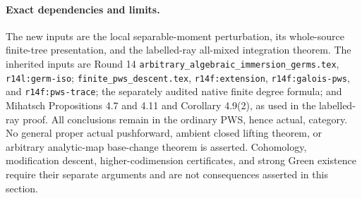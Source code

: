\paragraph{Exact dependencies and limits.}
The new inputs are the local separable-moment perturbation,
its whole-source finite-tree presentation, and the labelled-ray
all-mixed integration theorem.  The inherited inputs are Round 14
\texttt{arbitrary\_algebraic\_immersion\_germs.tex},
\texttt{r14l:germ-iso};
\texttt{finite\_pws\_descent.tex},
\texttt{r14f:extension}, \texttt{r14f:galois-pws}, and
\texttt{r14f:pws-trace}; the separately audited native finite
degree formula; and Mihatsch Propositions 4.7 and 4.11 and
Corollary 4.9(2), as used in the labelled-ray proof.
All conclusions remain in the ordinary PWS, hence actual,
category.  No general proper actual pushforward, ambient closed
lifting theorem, or arbitrary analytic-map base-change theorem
is asserted.  Cohomology, modification descent, higher-codimension
certificates, and strong Green existence require their separate
arguments and are not consequences asserted in this section.
